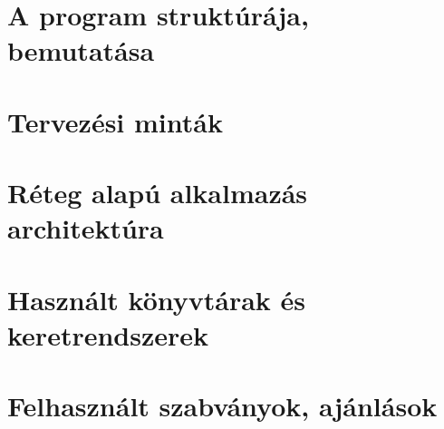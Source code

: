 \chapter{A program struktúrája, bemutatása}



\chapter{Tervezési minták}









\chapter{Réteg alapú alkalmazás architektúra}



\chapter{Használt könyvtárak és keretrendszerek}









\chapter{Felhasznált szabványok, ajánlások}







